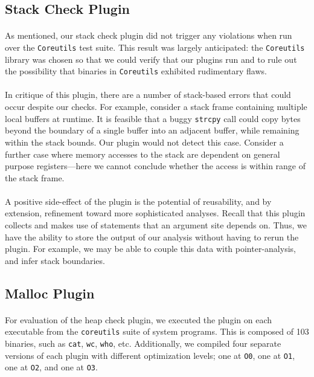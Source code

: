 \documentclass[letterpaper,11pt]{article}
\begin{document}
\subsection{Stack Check Plugin}

\paragraph{}
As mentioned, our stack check plugin did not trigger any violations when run
over the \texttt{Coreutils} test suite. This result was largely anticipated:
the \texttt{Coreutils} library was chosen so that we could verify that our
plugins run and to rule out the possibility that binaries in \texttt{Coreutils}
exhibited rudimentary flaws.

\paragraph{}
In critique of this plugin, there are a number of stack-based errors that could
occur despite our checks. For example, consider a stack frame containing
multiple local buffers at runtime. It is feasible that a buggy \texttt{strcpy}
call could copy bytes beyond the boundary of a single buffer into an adjacent
buffer, while remaining within the stack bounds. Our plugin would not detect
this case. Consider a further case where memory accesses to the stack
are dependent on general purpose registers---here we cannot conclude
whether the access is within range of the stack frame.

\paragraph{}
A positive side-effect of the plugin is the potential of reusability, and by
extension, refinement toward more sophisticated analyses. Recall that this
plugin collects and makes use of statements that an argument site depends on.
Thus, we have the ability to store the output of our analysis without having to
rerun the plugin. For example, we may be able to couple this data with
pointer-analysis, and infer stack boundaries.

\subsection{Malloc Plugin}
\paragraph{}
For evaluation of the heap check plugin, we executed the plugin on each
executable from the \texttt{coreutils} suite of system programs. This is
composed of 103 binaries, such as \texttt{cat}, \texttt{wc}, \texttt{who}, etc.
Additionally, we compiled four separate versions of each plugin with different
optimization levels; one at \texttt{O0}, one at \texttt{O1}, one at
\texttt{O2}, and one at \texttt{O3}.
\end{document}
